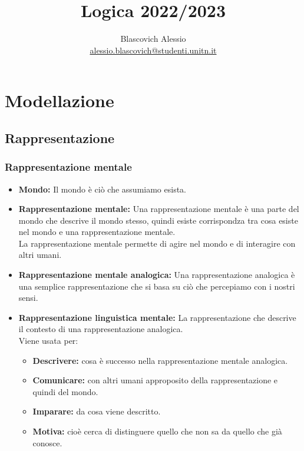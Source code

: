 \documentclass{book}
\title{Logica 2022/2023}
\author{Blascovich Alessio\\
    \href{mailto:alessio.blascovich@studenti.unitn.it}{alessio.blascovich@studenti.unitn.it}}
\date{}
\begin{document}
    \maketitle
    \tableofcontents
    \part{Modellazione}
    \chapter{Rappresentazione}

    \section{Rappresentazione mentale}
    \begin{itemize}
        \item \textbf{Mondo:} Il mondo è ciò che assumiamo esista.
        \item \textbf{Rappresentazione mentale:} Una rappresentazione mentale è una parte del mondo che descrive il mondo stesso, quindi esiste corrispondza tra cosa esiste nel mondo e una rappresentazione mentale.\\
            La rappresentazione mentale permette di agire nel mondo e di interagire con altri umani.
        \item \textbf{Rappresentazione mentale analogica:} Una rappresentazione analogica è una semplice rappresentazione che si basa su ciò che percepiamo con i nostri sensi.
        \item \textbf{Rappresentazione linguistica mentale:} La rappresentazione che descrive il contesto di una rappresentazione analogica.\\
            Viene usata per:
            \begin{itemize}
                \item \textbf{Descrivere:} cosa è successo nella rappresentazione mentale analogica.
                \item \textbf{Comunicare:} con altri umani approposito della rappresentazione e quindi del mondo.
                \item \textbf{Imparare:} da cosa viene descritto.
                \item \textbf{Motiva:} cioè cerca di distinguere quello che non sa da quello che già conosce. 
            \end{itemize}
    \end{itemize}
\end{document}
